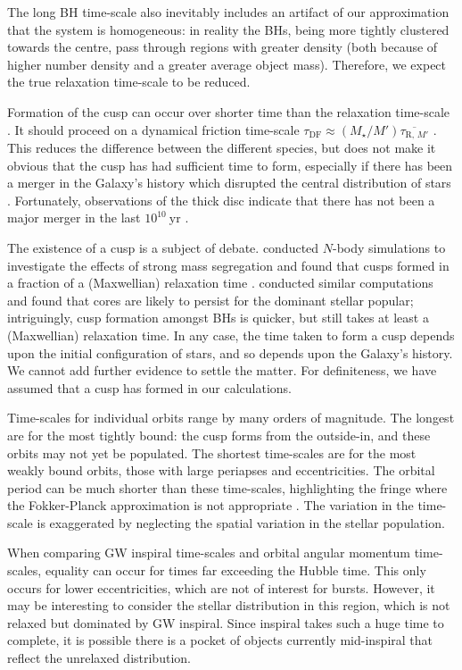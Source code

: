 \documentclass[useAMS,usedcolumn,usegraphicx,usenatbib]{mn2e}
\newcommand{\units}[1]{\ensuremath{~\mathrm{#1}}}
\newcommand{\sub}[1]{\ensuremath{_\mathrm{#1}}}
\begin{document}
\begin{onecolumn}
The long BH time-scale also inevitably includes an artifact of our approximation that the system is homogeneous: in reality the BHs, being more tightly clustered towards the centre, pass through regions with greater density (both because of higher number density and a greater average object mass). Therefore, we expect the true relaxation time-scale to be reduced. 

Formation of the cusp can occur over shorter time than the relaxation time-scale \citep{Bar-Or2012}. It should proceed on a dynamical friction time-scale $\tau\sub{DF} \approx (M_\star/M')\overline{\tau_{\mathrm{R},\,M'}}$ \citep[section 3.4]{Spitzer1987}. This reduces the difference between the different species, but does not make it obvious that the cusp has had sufficient time to form, especially if there has been a merger in the Galaxy's history which disrupted the central distribution of stars \citep{Gualandris2012}. Fortunately, observations of the thick disc indicate that there has not been a major merger in the last $10^{10}\units{yr}$ \citep{Wyse2008}.

The existence of a cusp is a subject of debate. \citet{Preto2010} conducted $N$-body simulations to investigate the effects of strong mass segregation \citep{Alexander2009, Keshet2009} and found that cusps formed in a fraction of a (Maxwellian) relaxation time \citep{Amaro-Seoane2011}. \citet{Gualandris2012} conducted similar computations and found that cores are likely to persist for the dominant stellar popular; intriguingly, cusp formation amongst BHs is quicker, but still takes at least a (Maxwellian) relaxation time. In any case, the time taken to form a cusp depends upon the initial configuration of stars, and so depends upon the Galaxy's history. We cannot add further evidence to settle the matter. For definiteness, we have assumed that a cusp has formed in our calculations.

Time-scales for individual orbits range by many orders of magnitude. The longest are for the most tightly bound: the cusp forms from the outside-in, and these orbits may not yet be populated. The shortest time-scales are for the most weakly bound orbits, those with large periapses and eccentricities. The orbital period can be much shorter than these time-scales, highlighting the fringe where the Fokker-Planck approximation is not appropriate \citep{Spitzer1972}. The variation in the time-scale is exaggerated by neglecting the spatial variation in the stellar population.

When comparing GW inspiral time-scales and orbital angular momentum time-scales, equality can occur for times far exceeding the Hubble time. This only occurs for lower eccentricities, which are not of interest for bursts. However, it may be interesting to consider the stellar distribution in this region, which is not relaxed but dominated by GW inspiral. Since inspiral takes such a huge time to complete, it is possible there is a pocket of objects currently mid-inspiral that reflect the unrelaxed distribution.


\end{onecolumn}
\end{document}
